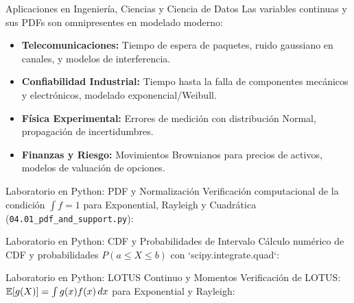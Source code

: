 \documentclass[10pt, aspectratio=169]{beamer}
\begin{document}
\begin{frame}{Aplicaciones en Ingeniería, Ciencias y Ciencia de Datos}
  \footnotesize
  Las variables continuas y sus PDFs son omnipresentes en modelado moderno: \pause

  \vspace{0.15cm}
  \begin{itemize}\itemsep=0.12cm
    \item \textbf{Telecomunicaciones:} Tiempo de espera de paquetes, ruido gaussiano en canales, y modelos de interferencia. \pause
    \item \textbf{Confiabilidad Industrial:} Tiempo hasta la falla de componentes mecánicos y electrónicos, modelado exponencial/Weibull. \pause
    \item \textbf{Física Experimental:} Errores de medición con distribución Normal, propagación de incertidumbres. \pause
    \item \textbf{Finanzas y Riesgo:} Movimientos Brownianos para precios de activos, modelos de valuación de opciones.
  \end{itemize}
\end{frame}

\begin{frame}[fragile]{Laboratorio en Python: PDF y Normalización}
  \scriptsize
  Verificación computacional de la condición $\int f = 1$ para Exponential, Rayleigh y Cuadrática (\texttt{04.01\_pdf\_and\_support.py}):
  \vspace{0.05cm}
  {
  }
\end{frame}

\begin{frame}[fragile]{Laboratorio en Python: CDF y Probabilidades de Intervalo}
  \scriptsize
  Cálculo numérico de CDF y probabilidades $P(a \le X \le b)$ con `scipy.integrate.quad`:
  \vspace{0.02cm}
  {
  }
\end{frame}

\begin{frame}[fragile]{Laboratorio en Python: LOTUS Continuo y Momentos}
  \scriptsize
  Verificación de LOTUS: $\mathbb{E}[g(X)] = \int g(x) f(x)\,dx$ para Exponential y Rayleigh:
  \vspace{0.02cm}
  {
  }
\end{frame}
\end{document}
